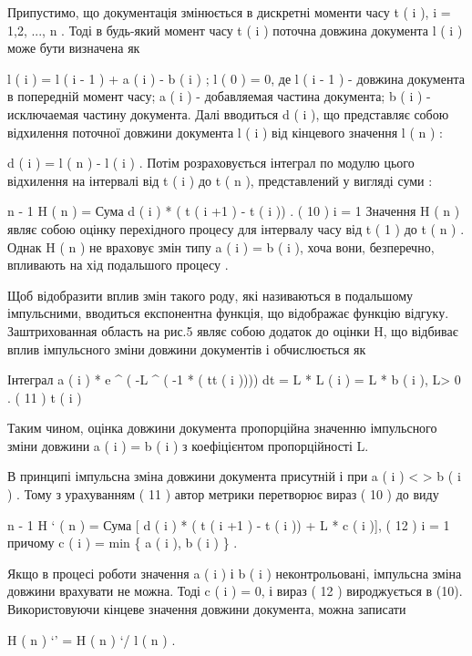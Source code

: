 \begin{description}
Припустимо, що документація змінюється в дискретні моменти часу t ( i ), i = 1,2, ..., n . Тоді в будь-який момент часу t ( i ) поточна довжина документа l ( i ) може бути визначена як

l ( i ) = l ( i - 1 ) + a ( i ) - b ( i ) ; l ( 0 ) = 0,
де l ( i - 1 ) - довжина документа в попередній момент часу; a ( i ) - добавляемая частина документа; b ( i ) - исключаемая частину документа.
Далі вводиться d ( i ), що представляє собою відхилення поточної довжини документа l ( i ) від кінцевого значення l ( n ) :

d ( i ) = l ( n ) - l ( i ) .
Потім розраховується інтеграл по модулю цього відхилення на інтервалі від t ( i ) до t ( n ), представлений у вигляді суми :

n - 1
H ( n ) = Сума \textbar{} d ( i ) \textbar{} * ( t ( i +1 ) - t ( i )) . ( 10 )
i = 1
Значення H ( n ) являє собою оцінку перехідного процесу для інтервалу часу від t ( 1 ) до t ( n ) . Однак H ( n ) не враховує змін типу a ( i ) = b ( i ), хоча вони, безперечно, впливають на хід подальшого процесу .

Щоб відобразити вплив змін такого роду, які називаються в подальшому імпульсними, вводиться експонентна функція, що відображає функцію відгуку. Заштрихованная область на рис.5 являє собою додаток до оцінки H, що відбиває вплив імпульсного зміни довжини документів і обчислюється як

Інтеграл a ( i ) * e \textasciicircum{} ( -L \textasciicircum{} ( -1 * ( tt ( i )))) dt = L * L ( i ) = L * b ( i ), L\textgreater{} 0 . ( 11 )
t ( i )

Таким чином, оцінка довжини документа пропорційна значенню імпульсного зміни довжини a ( i ) = b ( i ) з коефіцієнтом пропорційності L.

В принципі імпульсна зміна довжини документа присутній і при a ( i ) \textless{} \textgreater{} b ( i ) . Тому з урахуванням ( 11 ) автор метрики перетворює вираз ( 10 ) до виду

n - 1
H ` ( n ) = Сума {[} \textbar{} d ( i ) \textbar{} * ( t ( i +1 ) - t ( i )) + L * c ( i ){]}, ( 12 )
i = 1
причому c ( i ) = min \{ a ( i ), b ( i ) \} .

Якщо в процесі роботи значення a ( i ) і b ( i ) неконтрольовані, імпульсна зміна довжини врахувати не можна. Тоді c ( i ) = 0, і вираз ( 12 ) вироджується в (10). Використовуючи кінцеве значення довжини документа, можна записати

H ( n ) `' = H ( n ) `/ l ( n ) .

\end{description}



